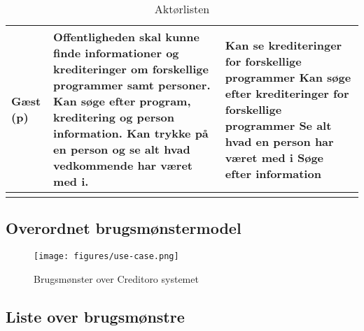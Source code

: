 \begin{longtable}{ |p{3.7cm}|p{6.15cm}|p{6.15cm}| }
\hline
Gæst (p) 
& Offentligheden skal kunne finde informationer og krediteringer om forskellige programmer samt personer. \newline Kan søge efter program, kreditering og person information. \newline Kan trykke på en person og se alt hvad vedkommende har været med i.
& Kan se krediteringer for forskellige programmer \newline Kan søge efter krediteringer for forskellige programmer \newline Se alt hvad en person har været med i \newline Søge efter information\\

\hline
\caption{Aktørlisten}
\label{table:aktørlist}

\end{longtable}



\subsection{Overordnet brugsmønstermodel}
\begin{figure}[H]
\centering 
\texttt{[image: figures/use-case.png]}
\caption{Brugsmønster over Creditoro systemet}
\end{figure}

\subsection{Liste over brugsmønstre}

